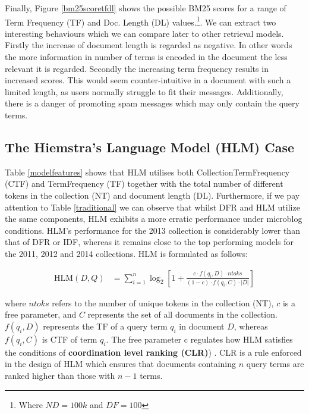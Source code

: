 Finally, Figure \ref{bm25scoretfdl} shows the possible BM25 scores for a range of Term Frequency (TF) and Doc. Length (DL) values.\footnote{Where \(ND=100k\) and \(DF=100\)}. We can extract two interesting behaviours which we can compare later to other retrieval models. Firstly the increase of document length is regarded as negative. In other words the more information in number of terms is encoded in the document the less relevant it is regarded. Secondly the increasing term frequency results in increased scores. This would seem counter-intuitive in a document with such a limited length, as users normally struggle to fit their messages. Additionally, there is a danger of promoting spam messages which may only contain the query terms.



\subsection{The Hiemstra's Language Model (HLM) Case}
Table \ref{modelfeatures} shows that HLM utilises both CollectionTermFrequency (CTF) and TermFrequency (TF) together with the total number of different tokens in the collection (NT) and document length (DL). Furthermore, if we pay attention to Table \ref{traditional} we can observe that whilst DFR and HLM utilize the same components, HLM exhibits a more erratic performance under microblog conditions. HLM's performance for the 2013 collection is considerably lower than that of DFR or IDF, whereas it remains close to the top performing models for the 2011, 2012 and 2014 collections. HLM is formulated as follows: 

\begin{small}
\begin{align}
\label{hlmformula}
    \text{HLM}(D,Q) &= \sum_{i=1}^{n} \log_2 \left[ 1 + \frac{c \cdot f(q_i, D) \cdot ntoks }{ (1-c) \cdot f(q_i, C) \cdot |D|} \right]
\end{align}
\end{small}

where $ntoks$ refers to the number of unique tokens in the collection (NT), $c$ is a free parameter, and $C$ represents the set of all documents in the collection. $f(q_i, D)$ represents the TF of a query term $q_i$ in document $D$, whereas $f(q_i, C)$ is CTF of term $q_i$. The free parameter c regulates how HLM satisfies the conditions of \textbf{coordination level ranking (CLR)}) \cite{hiemstra2000relating}. CLR is a rule enforced in the design of HLM which ensures that documents containing $n$ query terms are ranked higher than those with $n-1$ terms.

